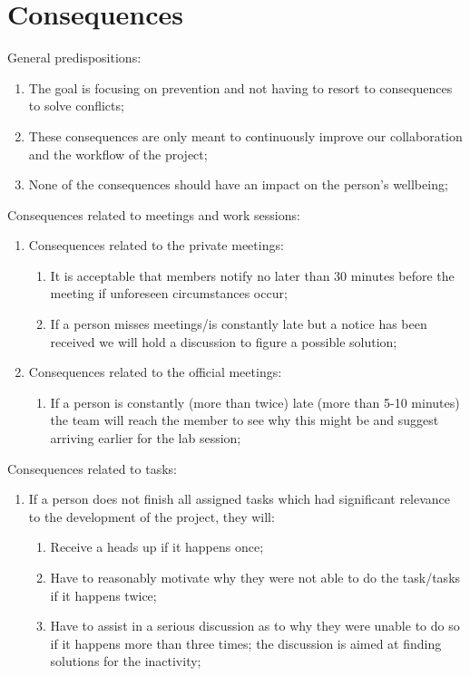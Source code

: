 \section{Consequences}
General predispositions:
\begin{enumerate}
    \item The goal is focusing on prevention and not having to resort to consequences to solve conflicts;
    \item These consequences are only meant to continuously improve our collaboration and the workflow of the project;
    \item None of the consequences should have an impact on the person’s wellbeing;
\end{enumerate}
Consequences related to meetings and work sessions:
\begin{enumerate}
    \item Consequences related to the private meetings:
    \begin{enumerate}
        \item It is acceptable that members notify no later than 30 minutes before the meeting if unforeseen circumstances occur;
        \item If a person misses meetings/is constantly late but a notice has been received we will hold a discussion to figure a possible solution;
    \end{enumerate}
    \item Consequences related to the official meetings:
    \begin{enumerate}
        \item If a person is constantly (more than twice) late (more than 5-10 minutes) the team will reach the member to see why this might be and suggest arriving earlier for the lab session;
    \end{enumerate}
\end{enumerate}
Consequences related to tasks:
\begin{enumerate}
    \item If a person does not finish all assigned tasks which had significant relevance to the development of the project, they will:
    \begin{enumerate}
        \item Receive a heads up if it happens once;
        \item Have to reasonably motivate why they were not able to do the task/tasks if it happens twice;
        \item Have to assist in a serious discussion as to why they were unable to do so if it happens more than three times; the discussion is aimed at finding solutions for the inactivity;
    \end{enumerate}
\end{enumerate}
